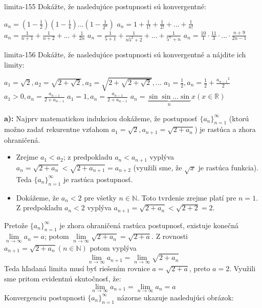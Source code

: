 \begin{defproblem}{limita-155}
Dokážte, že nasledujúce postupnosti sú konvergentné:
\begin{tasks}
\task $a_n=(1-\frac{1}{2})(1-\frac{1}{4})...(1-\frac{1}{2^n})$
\task $a_n=1+\frac{1}{1!}+\frac{1}{2!}+...+\frac{1}{n!}$
\task $a_n=\frac{1}{n+1}+\frac{1}{n+2}+...+\frac{1}{2n}$
\task $a_n=\frac{1}{5+1}+\frac{1}{n5^2+2}+...+\frac{1}{5^n+n}$
\task $a_n=\frac{10}{1}\cdot \frac{11}{3}\cdot ...\cdot \frac{n+9}{2n-1}$
\end{tasks}
\end{defproblem}

\begin{defproblem}{limita-156}
Dokážte, že nasledujúce postupnosti sú konvergentné a nájdite ich limity:
\begin{tasks}
\task $a_1=\sqrt{2}, a_2=\sqrt{2+\sqrt{2}}, a_3=\sqrt{2+\sqrt{2+\sqrt{2}}},...$
\task $a_1=\frac{1}{2}, a_n=\frac{1}{2}+\frac{{a_{n-1}}^{2}}{2}$
\task $a_1>0, a_n=\frac{a_{n-1}}{2+a_{n-1}}$
\task $a_1=1, a_n=\frac{a_{n-1}}{2+a_{n-1}}$
\task $a_n=\underbrace{\sin \sin ... \sin}_n x (x \in \mathbb{R})$
\end{tasks}

\begin{solution}
    \textbf{a):}
    Najprv matematickou indukciou dokážeme, že postupnosť
    ${\{a_n\}}_{n=1}^\infty$ (ktorú možno zadať rekurentne vzťahom
    $a_1=\sqrt{2},a_{n+1}=\sqrt{2+a_n}$) je rastúca a zhora ohraničená.
    \begin{itemize}
    \item
        Zrejme $a_1<a_2$; z predpokladu $a_n<a_{n+1}$ vyplýva
        $a_n=\sqrt{2+a_n}<\sqrt{2+a_{n+1}}=a_{n+2}$ (využili sme, že $\sqrt{x}$
        je rastúca funkcia). Teda ${\{a_n\}}_{n=1}^\infty$ je rastúca
        postupnosť.
    \item
        Dokážeme, že $a_n<2$ pre všetky $n \in \mathbb{N}$. Toto tvrdenie zrejme
        platí pre $n=1$. Z predpokladu $a_n<2$ vyplýva
        $a_{n+1}=\sqrt{2+a_{n}}<\sqrt{2+2}=2$.
    \end{itemize}

    Pretože ${\{a_n\}}_{n=1}^\infty$ je zhora ohraničená rastúca postupnosť,
    existuje konečná $\lim\limits_{n \rightarrow \infty} a_n=a$; potom
    $\lim\limits_{n \rightarrow \infty}\sqrt{2+a_n}=\sqrt{2+a}$. Z rovnosti
    $a_{n+1}=\sqrt{2+a_n} (n \in \mathbb{N})$ potom vyplýva
    \[
        \lim\limits_{n \rightarrow \infty} a_{n+1}
        = \lim\limits_{n \rightarrow \infty} \sqrt{2+a_n}
    \]
    Teda hľadaná limita musí byť riešením rovnice $a=\sqrt{2+a}$,
    preto $a=2$. Využili sme pritom evidentnú skutočnosť, že:
    \[
        \lim\limits_{n \rightarrow \infty} a_{n+1}
        =\lim\limits_{n \rightarrow \infty} a_n=a
    \]
    Konvergenciu postupnosti ${\{a_n\}}_{n=1}^\infty$ názorne ukazuje
    nasledujúci obrázok:
    

\end{solution}
\end{defproblem}
